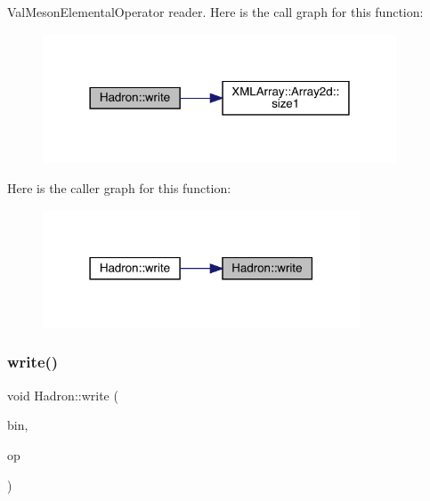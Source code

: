 Val\+Meson\+Elemental\+Operator reader. Here is the call graph for this function\+:
\nopagebreak
\begin{figure}[H]
\begin{center}
\leavevmode
\includegraphics[width=298pt]{d1/daf/namespaceHadron_af16b79349f97386286cfc1cd9dfb73f0_cgraph}
\end{center}
\end{figure}
Here is the caller graph for this function\+:
\nopagebreak
\begin{figure}[H]
\begin{center}
\leavevmode
\includegraphics[width=267pt]{d1/daf/namespaceHadron_af16b79349f97386286cfc1cd9dfb73f0_icgraph}
\end{center}
\end{figure}
\mbox{\label{namespaceHadron_a8953a24e53ffe4d60e9c0ba26a48a9e3}} 
\subsubsection{\texorpdfstring{write()}{write()}\hspace{0.1cm}{\footnotesize\ttfamily [64/95]}}
{\footnotesize\ttfamily void Hadron\+::write (\begin{DoxyParamCaption}\item[{\mbox{\hyperlink{classADATIO_1_1BinaryWriter}{Binary\+Writer}} \&}]{bin,  }\item[{const \mbox{\hyperlink{structHadron_1_1HadronQuarkLocation__t}{Hadron\+Quark\+Location\+\_\+t}} \&}]{op }\end{DoxyParamCaption})}



